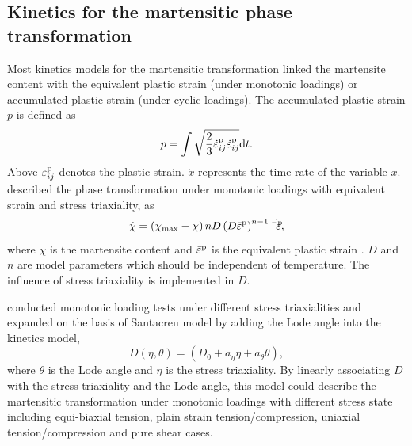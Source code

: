 \documentclass[final,5p,times,onecolumn,10pt,sort&compress]{elsarticle}
\begin{document}
\subsection{Kinetics for the martensitic phase transformation}
Most kinetics models for the martensitic transformation linked the martensite content with the equivalent plastic strain (under monotonic loadings) or accumulated plastic strain (under cyclic loadings). The accumulated plastic strain $p$ is defined as
\begin{equation}\label{eq:Accumulated plastic strain}
p=\int \sqrt{\frac{2}{3}{\dot\varepsilon _{ij}^{\rm p}\dot\varepsilon _{ij}^{\rm p}}}{\rm d}t.
\end{equation}
Above $\varepsilon _{ij}^{\rm p}$ denotes the plastic strain. $\dot x $ represents the time rate of the variable $x$. \cite{Santacreu2006Behaviour} described the phase transformation under monotonic loadings with equivalent strain and stress triaxiality, as
\begin{equation}\label{eq:Santacreu model}
\dot{\chi }= \left ( \chi _{\max} - \chi \right ) nD \left ( D \bar {\varepsilon}^{\rm p} \right )^{n-1}\dot{ \bar {\varepsilon }^{\rm p}},
\end{equation}
where $\chi$ is the martensite content and $\bar {\varepsilon }^{\rm p}$ is the equivalent plastic strain . $D$ and $n$ are model parameters which should be independent of temperature. The influence of stress triaxiality is implemented in $D$.

\cite{Beese2011Effect} conducted monotonic loading tests under different stress triaxialities and expanded on the basis of Santacreu model by adding the Lode angle  into the kinetics model,
\begin{equation}\label{eq:Beese model}
D\left ( \eta,\theta  \right )=\left ( D_{0}+a_{\eta}\eta+a_{\theta}\theta \right ),
\end{equation}
where $\theta$ is the Lode angle  and $\eta$ is the stress triaxiality. By linearly associating $D$ with the stress triaxiality and the Lode angle, this model could describe the martensitic transformation under monotonic loadings with different stress state including equi-biaxial tension, plain strain tension/compression, uniaxial tension/compression and pure shear cases.
\end{document}
